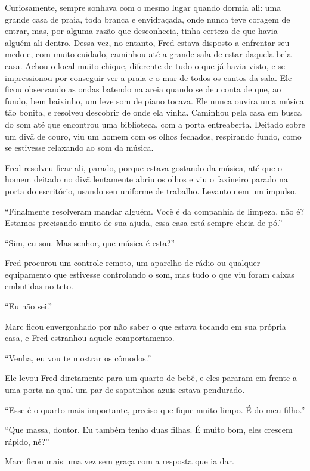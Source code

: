 Curiosamente, sempre sonhava com o mesmo lugar quando dormia ali: uma
grande casa de praia, toda branca e envidraçada, onde nunca teve coragem
de entrar, mas, por alguma razão que desconhecia, tinha certeza de que
havia alguém ali dentro. Dessa vez, no entanto, Fred estava disposto a
enfrentar seu medo e, com muito cuidado, caminhou até a grande
sala de estar daquela bela casa. Achou o local muito chique, diferente
de tudo o que já havia visto, e se impressionou por conseguir ver a praia
e o mar de todos os cantos da sala. Ele ficou observando as
ondas batendo na areia quando se deu conta de que, ao fundo, bem
baixinho, um leve som de piano tocava. Ele nunca ouvira uma música tão
bonita, e resolveu descobrir de onde ela vinha. Caminhou pela casa em
busca do som até que encontrou uma biblioteca, com a porta entreaberta.
Deitado sobre um divã de couro, viu um homem com os olhos fechados,
respirando fundo, como se estivesse relaxando ao som da música.

Fred resolveu ficar ali, parado, porque estava gostando da música, até
que o homem deitado no divã lentamente abriu os olhos e viu o faxineiro
parado na porta do escritório, usando seu uniforme de trabalho. Levantou
em um impulso.

``Finalmente resolveram mandar alguém. Você é da companhia de limpeza,
não é? Estamos precisando muito de sua ajuda, essa casa está sempre
cheia de pó.''

``Sim, eu sou. Mas senhor, que música é esta?''

Fred procurou um
controle remoto, um aparelho de rádio ou qualquer equipamento que
estivesse controlando o som, mas tudo o que viu foram caixas embutidas
no teto.

``Eu não sei.''

Marc ficou envergonhado por não saber o que estava tocando em
sua própria casa, e Fred estranhou aquele comportamento.

``Venha, eu vou te mostrar os cômodos.''

Ele levou Fred diretamente para um quarto de bebê, e eles pararam em
frente a uma porta na qual um par de sapatinhos azuis estava pendurado.

``Esse é o quarto mais importante, preciso que fique muito limpo. É do
meu filho.''

``Que massa, doutor. Eu também tenho duas filhas. É muito bom, eles
crescem rápido, né?''

Marc ficou mais uma vez sem graça com a resposta que ia dar.

